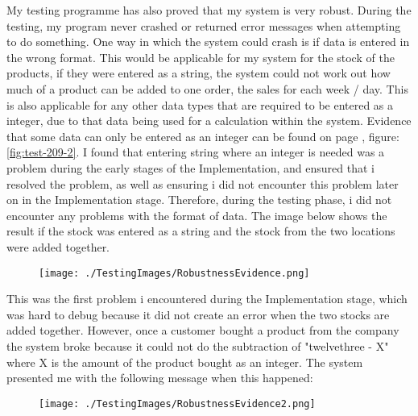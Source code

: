 My testing programme has also proved that my system is very robust. During the testing, my program never crashed or returned error messages when attempting to do something. One way in which the system could crash is if data is entered in the wrong format. This would be applicable for my system for the stock of the products, if they were entered as a string, the system could not work out how much of a product can be added to one order, the sales for each week / day. This is also applicable for any other data types that are required to be entered as a integer, due to that data being used for a calculation within the system. Evidence that some data can only be entered as an integer can be found on page \pageref{fig:test-209-2}, figure:\ref{fig:test-209-2}. I found that entering string where an integer is needed was a problem during the early stages of the Implementation, and ensured that i resolved the problem, as well as ensuring i did not encounter this problem later on in the Implementation stage. Therefore, during the testing phase, i did not encounter any problems with the format of data. The image below shows the result if the stock was entered as a string and the stock from the two locations were added together.

\begin{figure}[H]
\texttt{[image: ./TestingImages/RobustnessEvidence.png]}
\end{figure}

This was the first problem i encountered during the Implementation stage, which was hard to debug because it did not create an error when the two stocks are added together. However, once a customer bought a product from the company the system broke because it could not do the subtraction of "twelvethree - X" where X is the amount of the product bought as an integer. The system presented me with the following message when this happened:

\begin{figure}[H]
\texttt{[image: ./TestingImages/RobustnessEvidence2.png]}
\end{figure}



